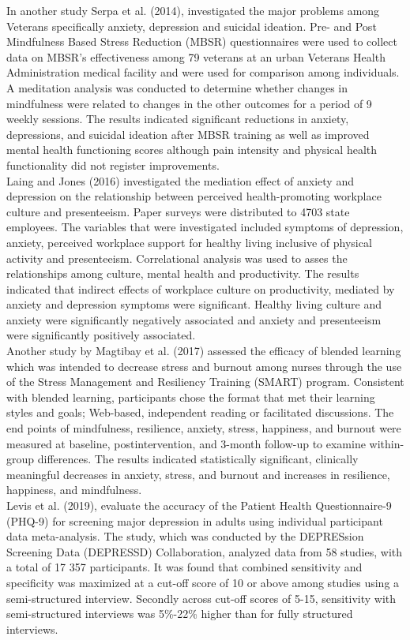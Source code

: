 \documentclass[12pt]{article}
\numberwithin{equation}{section}
\begin{document}
\noindent In another study Serpa et al. (2014), investigated the major problems among Veterans specifically anxiety, depression and suicidal ideation. Pre- and Post Mindfulness Based Stress Reduction (MBSR) questionnaires were used to collect data on MBSR's effectiveness among 79 veterans at an urban Veterans Health Administration medical facility and were used for comparison among individuals. A meditation analysis was conducted to determine whether changes in mindfulness were related to changes in the other outcomes for a period of 9 weekly sessions. The results indicated significant reductions in anxiety, depressions, and suicidal ideation after MBSR training as well as improved mental health functioning scores although pain intensity and physical health functionality did not register improvements.\\
\noindent Laing and Jones (2016) investigated the mediation effect of anxiety and depression on the relationship between perceived health-promoting workplace culture and presenteeism. Paper surveys were distributed to 4703 state employees. The variables that were investigated included symptoms of depression, anxiety, perceived workplace support for healthy living inclusive of physical activity and presenteeism. Correlational analysis was used to asses the relationships among culture, mental health and productivity. The results indicated that indirect effects of workplace culture on productivity, mediated by anxiety and depression symptoms were significant. Healthy living culture and anxiety were significantly negatively associated and anxiety and presenteeism were significantly positively associated.\\
\noindent Another study by Magtibay et al. (2017) assessed the efficacy of blended learning which was intended to decrease stress and burnout among nurses through the use of the Stress Management and Resiliency Training (SMART) program. Consistent with blended learning, participants chose the format that met their learning styles and goals; Web-based, independent reading or facilitated discussions. The end points of mindfulness, resilience, anxiety, stress, happiness, and burnout were measured at baseline, postintervention, and 3-month follow-up to examine within-group differences. The results indicated statistically significant, clinically meaningful decreases in anxiety, stress, and burnout and increases in resilience, happiness, and mindfulness. \\
\noindent Levis et al. (2019), evaluate the accuracy of the Patient Health Questionnaire-9 (PHQ-9) for screening major depression in adults using individual participant data meta-analysis. The study, which was conducted by the DEPRESsion Screening Data (DEPRESSD) Collaboration, analyzed data from 58 studies, with a total of 17 357 participants. It was found that combined sensitivity and specificity was maximized at a cut-off score of 10 or above among studies using a semi-structured interview. Secondly across cut-off scores of 5-15, sensitivity with semi-structured interviews was 5\%-22\% higher than for fully structured interviews.  \\
\end{document}

